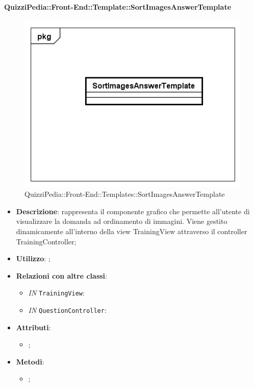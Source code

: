 		\paragraph{QuizziPedia::Front-End::Template::SortImagesAnswerTemplate}
		
		\label{QuizziPedia::Front-End::Templates::SortImagesAnswerTemplate}
		
		\begin{figure}[h]
			\centering
			\includegraphics[scale=0.5,keepaspectratio]{UML/Classi/Front-End/QuizziPedia_Front-end_Templates_SortImagesAnswerTemplate.png}
			\caption{QuizziPedia::Front-End::Templates::SortImagesAnswerTemplate}
		\end{figure}
		
		\begin{itemize}
			\item \textbf{Descrizione}: rappresenta il componente grafico che permette all'utente di visualizzare la domanda ad ordinamento di immagini. Viene gestito dinamicamente all'interno della view TrainingView attraverso il controller TrainingController;
			\item \textbf{Utilizzo}: ;
			\item \textbf{Relazioni con altre classi}: 
			\begin{itemize}
				\item \textit{IN} \texttt{TrainingView}: 
				\item \textit{IN} \texttt{QuestionController}:
			\end{itemize}
			\item \textbf{Attributi}: 
			\begin{itemize}
				\item ;
			\end{itemize}
			\item \textbf{Metodi}: 
			\begin{itemize}
				\item ;
			\end{itemize}
		\end{itemize}
		
